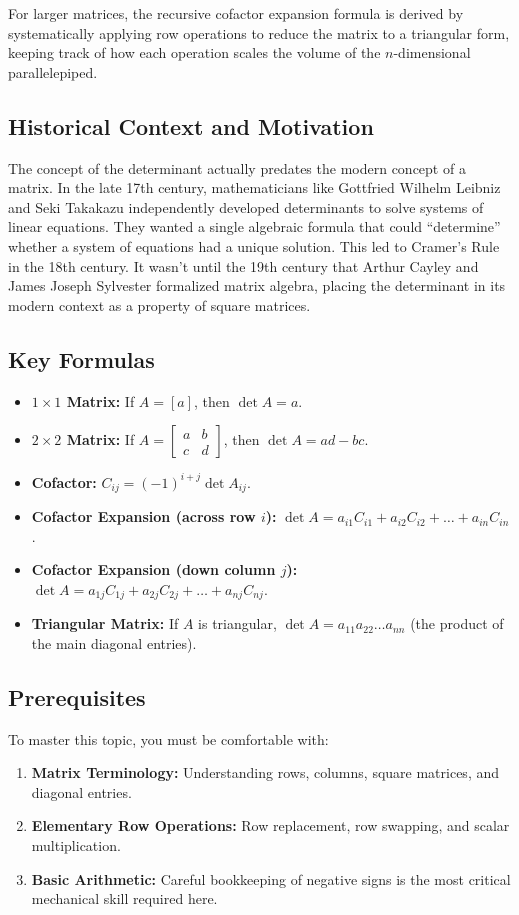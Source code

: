 \documentclass{article}
\begin{document}
For larger matrices, the recursive cofactor expansion formula is derived by systematically applying row operations to reduce the matrix to a triangular form, keeping track of how each operation scales the volume of the $n$-dimensional parallelepiped.

\subsection{Historical Context and Motivation}
The concept of the determinant actually predates the modern concept of a matrix. In the late 17th century, mathematicians like Gottfried Wilhelm Leibniz and Seki Takakazu independently developed determinants to solve systems of linear equations. They wanted a single algebraic formula that could ``determine'' whether a system of equations had a unique solution. This led to Cramer's Rule in the 18th century. It wasn't until the 19th century that Arthur Cayley and James Joseph Sylvester formalized matrix algebra, placing the determinant in its modern context as a property of square matrices.

\subsection{Key Formulas}
\begin{itemize}
    \item \textbf{$1 \times 1$ Matrix:} If $A = [a]$, then $\det A = a$.
    \item \textbf{$2 \times 2$ Matrix:} If $A = \begin{bmatrix} a & b \\ c & d \end{bmatrix}$, then $\det A = ad - bc$.
    \item \textbf{Cofactor:} $C_{ij} = (-1)^{i+j} \det A_{ij}$.
    \item \textbf{Cofactor Expansion (across row $i$):} $\det A = a_{i1}C_{i1} + a_{i2}C_{i2} + \dots + a_{in}C_{in}$.
    \item \textbf{Cofactor Expansion (down column $j$):} $\det A = a_{1j}C_{1j} + a_{2j}C_{2j} + \dots + a_{nj}C_{nj}$.
    \item \textbf{Triangular Matrix:} If $A$ is triangular, $\det A = a_{11}a_{22} \dots a_{nn}$ (the product of the main diagonal entries).
\end{itemize}

\subsection{Prerequisites}
To master this topic, you must be comfortable with:
\begin{enumerate}
    \item \textbf{Matrix Terminology:} Understanding rows, columns, square matrices, and diagonal entries.
    \item \textbf{Elementary Row Operations:} Row replacement, row swapping, and scalar multiplication.
    \item \textbf{Basic Arithmetic:} Careful bookkeeping of negative signs is the most critical mechanical skill required here.
\end{enumerate}
\end{document}
